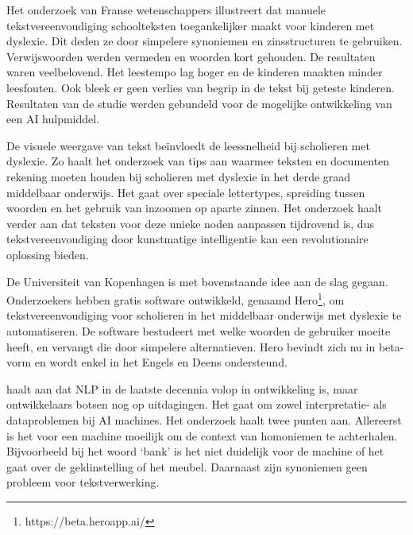 
Het onderzoek van Franse wetenschappers \newline \textcite{Gala2016} illustreert dat manuele tekstvereenvoudiging schoolteksten toegankelijker \newline maakt voor kinderen met dyslexie. Dit deden ze door simpelere synoniemen en zinsstructuren te gebruiken. Verwijswoorden werden vermeden en woorden kort gehouden. De resultaten waren veelbelovend. Het leestempo lag hoger en de kinderen maakten minder leesfouten. Ook bleek er geen verlies van begrip in de tekst bij geteste kinderen. Resultaten van de studie werden gebundeld voor de mogelijke ontwikkeling van een AI hulpmiddel.

De visuele weergave van tekst beïnvloedt de leessnelheid bij scholieren met dyslexie. Zo haalt het onderzoek van \textcite{Rello2012} tips aan waarmee teksten en documenten rekening moeten houden bij scholieren met dyslexie in het derde graad middelbaar onderwijs. Het gaat over speciale lettertypes, spreiding tussen woorden en het gebruik van inzoomen op aparte zinnen. Het onderzoek haalt verder aan dat teksten voor deze unieke noden aanpassen tijdrovend is, dus tekstvereenvoudiging door kunstmatige intelligentie kan een revolutionaire oplossing bieden. 

De Universiteit van Kopenhagen is met bovenstaande idee aan de slag gegaan. Onderzoekers \textcite{Bingel2018} hebben gratis software ontwikkeld, genaamd Hero\footnote{https://beta.heroapp.ai/}, om tekstvereenvoudiging voor scholieren in het middelbaar onderwijs met dyslexie te automatiseren. De software bestudeert met welke woorden de gebruiker moeite heeft, en vervangt die door simpelere alternatieven. Hero bevindt zich nu in beta-vorm en wordt enkel in het Engels en Deens ondersteund. 

\textcite{Roldos2020} haalt aan dat NLP in de laatste decennia volop in ontwikkeling is, maar ontwikkelaars botsen nog op uitdagingen. Het gaat om zowel interpretatie- als dataproblemen bij AI machines. Het onderzoek haalt twee punten aan. Allereerst is het voor een machine moeilijk om de context van homoniemen te achterhalen. Bijvoorbeeld bij het woord ‘bank’ is het niet duidelijk voor de machine of het gaat over de geldinstelling of het meubel. Daarnaast zijn synoniemen geen probleem voor tekstverwerking.

